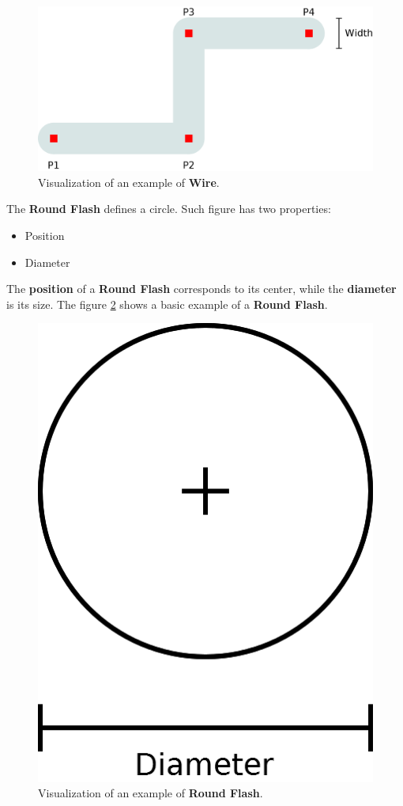 \documentclass[11pt,twoside,openany,x11names,svgnames]{memoir}
\begin{document}
\begin{figure}
	\centering
	\includegraphics[scale=0.2, clip=true, trim= 0pt 0pt 0pt 0pt]{images/chapter03-image05}
	\caption{Visualization of an example of \textbf{Wire}.}
	\label{fig:wire}
\end{figure}

The \textbf{Round Flash} defines a circle. Such figure has two properties:

\begin{itemize}
\item Position
\item Diameter
\end{itemize}

The \textbf{position} of a \textbf{Round Flash} corresponds to its center, while the \textbf{diameter} is its size. The figure \ref{fig:roundflash} shows a basic example of a \textbf{Round Flash}.

\begin{figure}
	\centering
	\includegraphics[scale=0.2, clip=true, trim= 0pt 0pt 0pt 0pt]{images/chapter03-image06}
	\caption{Visualization of an example of \textbf{Round Flash}.}
	\label{fig:roundflash}
\end{figure}
\end{document}
